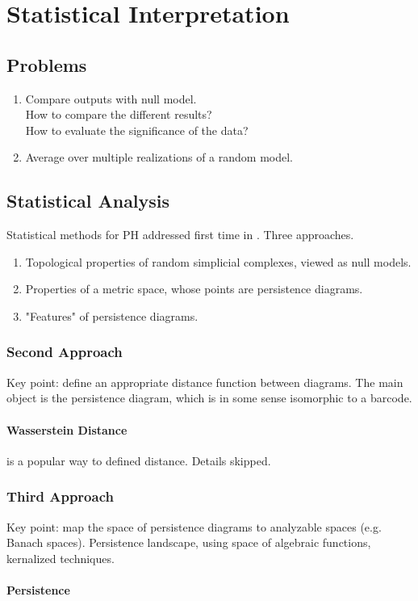\documentclass[10pt,a4paper]{article}
\begin{document}
\section{Statistical Interpretation}
\subsection{Problems}
\begin{enumerate}
	\item Compare outputs with null model.\\
	How to compare the different results?\\
	How to evaluate the significance of the data?
	\item Average over multiple realizations of a random model.
\end{enumerate}
\subsection{Statistical Analysis}
Statistical methods for PH addressed first time in \cite{Bubenik2007}. Three approaches.
\begin{enumerate}
	\item Topological properties of random simplicial complexes, viewed as null models.
	\item Properties of a metric space, whose points are persistence diagrams.
	\item "Features" of persistence diagrams.
\end{enumerate}
\subsubsection{Second Approach}
Key point: define an appropriate distance function between diagrams. The main object is the persistence diagram, which is in some sense isomorphic to a barcode.
\paragraph{Wasserstein Distance} is a popular way to defined distance. Details skipped.
\subsubsection{Third Approach}
Key point: map the space of persistence diagrams to analyzable spaces (e.g. Banach spaces). Persistence landscape\cite{Bubenik2015}, using space of algebraic functions\cite{Adcock2013}, kernalized techniques.
\paragraph{Persistence }
\end{document}
